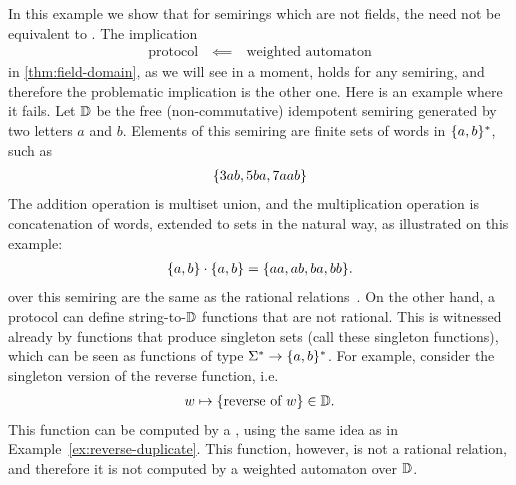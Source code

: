 \begin{myexample}
    \label{ex:non-commutative-semirings} 
    In this example we show that for semirings which are not fields, the  need not be equivalent to . The implication 
    \begin{align*}
    \text{protocol} \quad \impliedby \quad \text{weighted automaton}
    \end{align*}
    in \cref{thm:field-domain}, as we will see in a moment, holds for any
    semiring, and therefore the problematic implication is the other one. Here
    is an example where it fails. Let $\mathbb D$ be  the free (non-commutative)
    idempotent semiring generated by two letters $a$ and $b$. Elements of this
    semiring are finite sets of words in $\{a,b\}^*$, such as 
    \begin{align*}
    \{3ab, 5ba, 7aab\}
    \end{align*}
    The addition operation is multiset union, 
    and the multiplication operation is concatenation of words, 
    extended to sets in the natural way, as illustrated on this example:
    \begin{align*}
    \{a,b\}\cdot \{a,b\} = \{aa, ab, ba, bb\}.
    \end{align*}
     over this semiring are the same as the 
    rational relations~\cite[Chapter IX]{Eilenberg74}. 
    On the other hand, a protocol can define string-to-$\mathbb D$ functions
    that are not rational. This is witnessed already by functions that produce 
    singleton sets (call these singleton functions), which can be seen as 
    functions of type $\Sigma^* \to \{a,b\}^*$. For example, consider 
    the singleton version of the  reverse function, i.e.
    \begin{align*}
    w \mapsto \{\text{reverse of $w$}\} \in \mathbb D.
    \end{align*}
    This function can be computed by a , using the same idea as in 
    Example~\ref{ex:reverse-duplicate}. This function, however, is not
    a rational relation, and therefore it is not computed by a weighted automaton over $\mathbb D$. 

\end{myexample}
